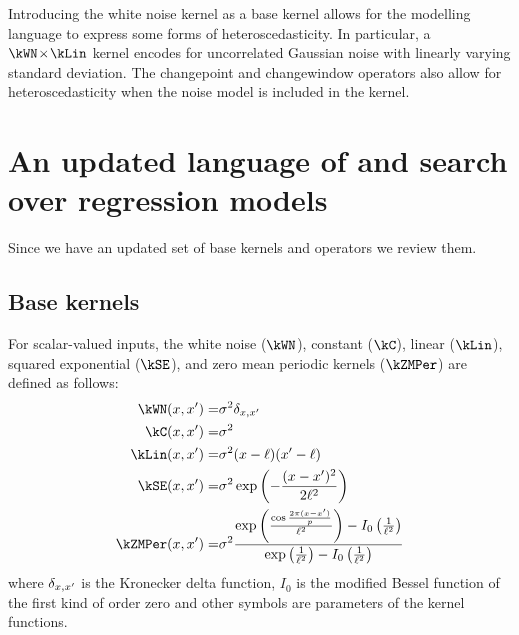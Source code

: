 Introducing the white noise kernel as a base kernel allows for the modelling language to express some forms of heteroscedasticity.
In particular, a $\kWN \kerntimes \kLin$ kernel encodes for uncorrelated Gaussian noise with linearly varying standard deviation.
The changepoint and changewindow operators also allow for heteroscedasticity when the noise model is included in the kernel.

\section{An updated language of  and search over regression models}
\label{sec:description:language}


Since we have an updated set of base kernels and operators we review them.

\subsection{Base kernels}
\label{sec:description:base}

For scalar-valued inputs, the white noise ($\kWN$), constant ($\kC$), linear ($\kLin$), squared exponential ($\kSE$), and zero mean periodic kernels ($\kZMPer$) are defined as follows:
\begin{eqnarray}
\kWN(\inputVar, \inputVar') =& \sigma^2\delta_{\inputVar, \inputVar'} \\
\kC(\inputVar, \inputVar') =& \sigma^2 \\
\kLin(\inputVar, \inputVar') =& \sigma^2(\inputVar - \ell)(\inputVar' - \ell) \\
\kSE(\inputVar, \inputVar') =& \sigma^2\exp\left(-\frac{(\inputVar - \inputVar')^2}{2\ell^2}\right) \\
\kZMPer(\inputVar, \inputVar') =&  \sigma^2\frac{\exp\left(\frac{\cos\frac{2 \pi (\inputVar - \inputVar')}{p}}{\ell^2}\right) - I_0\left(\frac{1}{\ell^2}\right)}{\exp\left(\frac{1}{\ell^2}\right) - I_0\left(\frac{1}{\ell^2}\right)}
\end{eqnarray}
where $\delta_{x, x'}$ is the Kronecker delta function, $I_0$ is the modified Bessel function of the first kind of order zero and other symbols are parameters of the kernel functions.

